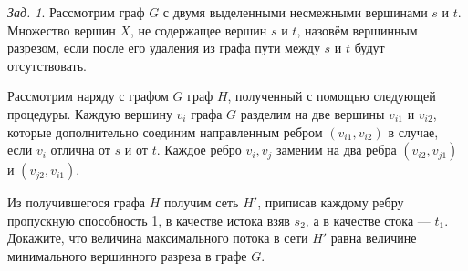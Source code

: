 \documentclass[a4paper,12pt]{article}
\theoremstyle{remark}
\newtheorem{problem}{Зад.}[section]
\begin{document}
\begin{problem}
	Рассмотрим граф $G$ с двумя выделенными несмежными вершинами $s$ и $t$. Множество вершин $X$, не содержащее вершин $s$ и $t$, назовём вершинным разрезом, если после его удаления из графа пути между $s$ и $t$ будут отсутствовать.
	
	Рассмотрим наряду с графом $G$ граф $H$, полученный с помощью следующей процедуры. Каждую вершину $v_i$ графа $G$ разделим на две вершины $v_{i1}$ и $v_{i2}$, которые дополнительно соединим направленным ребром $(v_{i1},v_{i2})$ в случае, если $v_i$ отлична от $s$ и от $t$. Каждое ребро ${v_i,v_j}$ заменим на два ребра $(v_{i2},v_{j1})$ и $(v_{j2},v_{i1})$.
	
	Из получившегося графа $H$ получим сеть $H'$, приписав каждому ребру пропускную способность 1, в качестве истока взяв $s_2$, а в качестве стока — $t_1$. Докажите, что величина максимального потока в сети $H'$ равна величине минимального вершинного разреза в графе $G$.
\end{problem}
\end{document}
